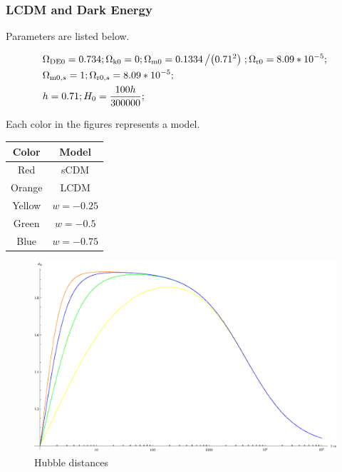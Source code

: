 \documentclass{article}
\begin{document}
\subsubsection{LCDM and Dark Energy}

Parameters are listed below.

\begin{eqnarray}
&\Omega _{\text{DE0}}=0.734;\Omega _{\text{k0}}=0;\Omega _{\text{m0}}=0.1334\left/\left(0.71^2\right)\right.;
\Omega _{\text{r0}}=8.09*10^{-5};
\\
&\Omega _{\text{m0},s}=1;\Omega _{\text{r0},s}=8.09*10^{-5};\\
&h=0.71;H_0=\frac{100 h}{300000};
\end{eqnarray}

Each color in the figures represents a model.
\vspace{2ex}
\begin{center}
\begin{tabular}{|c|c|}\hline
{\bf Color} & {\bf Model} \\\hline
Red & sCDM \\\hline
Orange & LCDM \\\hline
Yellow & $w=-0.25$ \\ \hline
Green &  $w=-0.5$ \\ \hline
Blue & $w=-0.75$ \\ \hline
\end{tabular}
\end{center}
\vspace{2ex}





\begin{figure}[!htbp]
\centering
\includegraphics[width=400pt]{DE_HubbleDistances.eps} 
\caption{Hubble distances}\label{fig:DE_HubbleDistances}
\end{figure}
\end{document}
